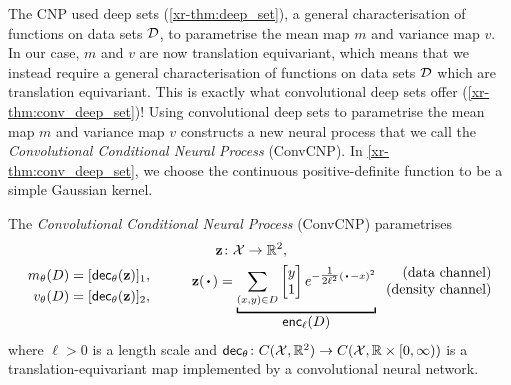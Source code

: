 \documentclass[12pt]{report}
\newcommand{\xrprefix}[1]{xr-#1}
\begin{document}
The CNP used deep sets (\cref{\xrprefix{thm:deep_set}}), a general characterisation of functions on data sets $\mathcal{D}$, to parametrise the mean map $m$ and variance map $v$.
In our case, $m$ and $v$ are now translation equivariant, which means that we instead require a general characterisation of functions on data sets $\mathcal{D}$ which are translation equivariant. 
This is exactly what convolutional deep sets offer (\cref{\xrprefix{thm:conv_deep_set}})!
Using convolutional deep sets to parametrise the mean map $m$ and variance map $v$ constructs a new neural process that we call the \emph{Convolutional Conditional Neural Process} (ConvCNP).
In \cref{\xrprefix{thm:conv_deep_set}}, we choose the continuous positive-definite function to be a simple Gaussian kernel.

\begin{model}
    \label{mod:convcnp}
    The \emph{Convolutional Conditional Neural Process} (ConvCNP) parametrises
    \begin{equation*}
        \begin{aligned}
            m_\theta(D) &= [\dec_\theta(\vz)]_1, \\
            v_\theta(D) &= [\dec_\theta(\vz)]_2,
        \end{aligned}
        \quad\qquad
        \begin{aligned}
            \vz \!\!&\,\,\colon \X \to \R^2, \\
            \vz(\vardot) &= \underbracket[1pt]{
                \sum_{(x, y) \in D}
                \begin{bmatrix}
                    y \\ 1
                \end{bmatrix}
                e^{-\tfrac1{2\ell^2}(\vardot - x)^2}
            }_{
                \displaystyle\enc_\ell(D)
            }
            \;\;
            \begin{matrix*}[r]
                \text{\normalshape (data channel)} \\
                \text{\normalshape (density channel)}
            \end{matrix*}
        \end{aligned}
    \end{equation*}
    where $\ell > 0$ is a length scale and $\mathsf{dec}_\theta \colon C(\mathcal{X}, \mathbb{R}^2) \to C(\mathcal{X}, \mathbb{R} \times [0, \infty))$ is a translation-equivariant map implemented by a convolutional neural network.
\end{model}
\end{document}

